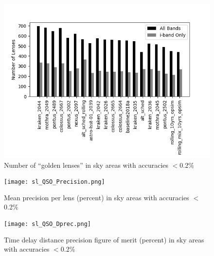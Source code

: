 \begin{figure}
\centering
\includegraphics[width=\linewidth]{figures/sl_QSO_Nlens.png}    
		\caption{Number of ``golden lenses'' in sky areas with accuracies $<$0.2\%}   
\end{figure}

\begin{figure}
\centering
\texttt{[image: sl\_QSO\_Precision.png]}    
		\caption{Mean precision per lens (percent) in  sky areas with accuracies $<$0.2\%}  
\end{figure}
\begin{figure}
\centering
		\texttt{[image: sl\_QSO\_Dprec.png]}    
		\caption{Time delay distance precision figure of merit (percent) in  sky areas with accuracies $<$0.2\%} 
\end{figure}

